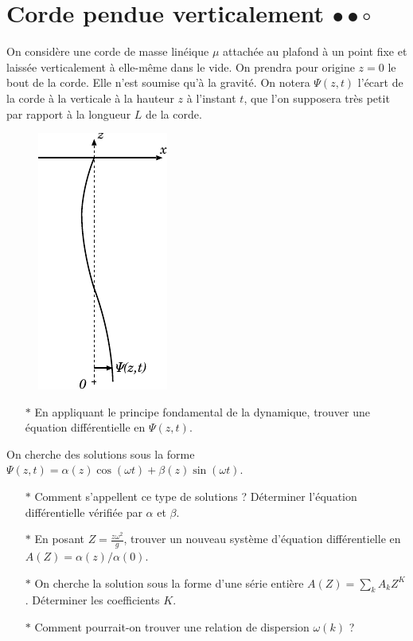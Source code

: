 \documentclass{report}
\begin{document}
\newpage

\section*{Corde pendue verticalement  $\bullet\bullet\circ$}

On considère une corde de masse linéique $\mu$ attachée au plafond à un point fixe et laissée verticalement à elle-même dans le vide. On prendra pour origine $z=0$ le bout de la corde. Elle n'est soumise qu'à la gravité. On notera $\Psi(z,t)$ l'écart de la corde à la verticale à la hauteur $z$ à l'instant $t$, que l'on supposera très petit par rapport à la longueur $L$ de la corde.

\begin{figure}[h!]
\centering
	\includegraphics[scale=1.5]{onde4.pdf}
\end{figure}


\begin{itemize}

	\item[$\ast$] En appliquant le principe fondamental de la dynamique, trouver une équation différentielle en  $\Psi(z,t)$.

\end{itemize}

On cherche des solutions sous la forme $\Psi(z,t)=\alpha(z)\cos(\omega t)+\beta(z)\sin(\omega t)$. 

\begin{itemize}
	
		\item[$\ast$] Comment s'appellent ce type de solutions ? Déterminer l'équation différentielle vérifiée par $\alpha$ et $\beta$.
		
		\item[$\ast$] En posant $Z=\frac{z\omega^2}{g}$, trouver un nouveau système d'équation différentielle en $A(Z)=\alpha(z)/\alpha(0)$. 
		
		\item[$\ast$] On cherche la solution sous la forme d'une série entière $A(Z)=\sum_k A_k Z^K$. Déterminer les coefficients $K$. 
		
		\item[$\ast$] Comment pourrait-on trouver une relation de dispersion $\omega(k)$ ?
		
\end{itemize}
\end{document}
